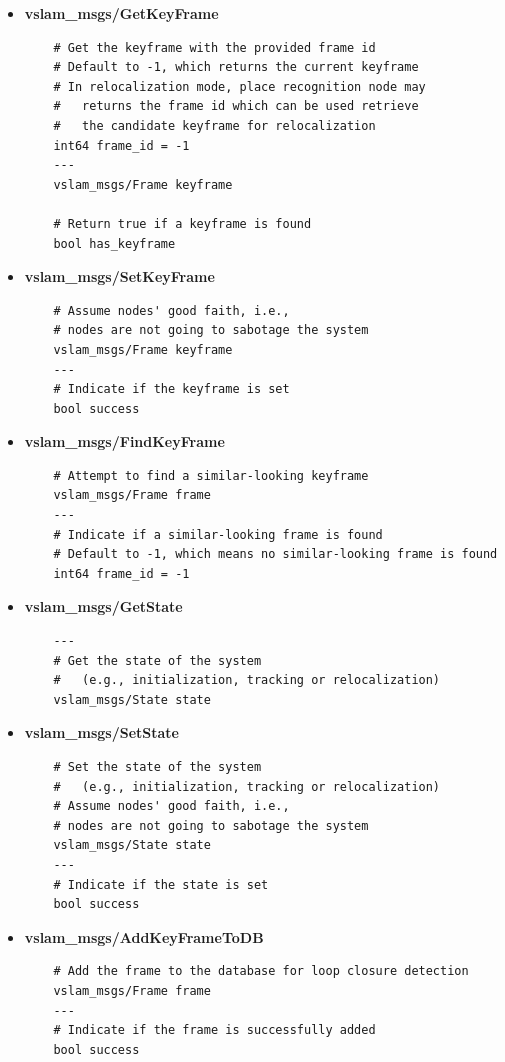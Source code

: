 \begin{itemize}
  \item \textbf{vslam\_msgs/GetKeyFrame}
  \begin{verbatim}
    # Get the keyframe with the provided frame id
    # Default to -1, which returns the current keyframe
    # In relocalization mode, place recognition node may 
    #   returns the frame id which can be used retrieve 
    #   the candidate keyframe for relocalization
    int64 frame_id = -1
    ---
    vslam_msgs/Frame keyframe
    
    # Return true if a keyframe is found
    bool has_keyframe
  \end{verbatim}

  \item \textbf{vslam\_msgs/SetKeyFrame}
  \begin{verbatim}
    # Assume nodes' good faith, i.e.,
    # nodes are not going to sabotage the system
    vslam_msgs/Frame keyframe
    ---
    # Indicate if the keyframe is set
    bool success
  \end{verbatim}

  \item \textbf{vslam\_msgs/FindKeyFrame}
  \begin{verbatim}
    # Attempt to find a similar-looking keyframe
    vslam_msgs/Frame frame
    ---
    # Indicate if a similar-looking frame is found
    # Default to -1, which means no similar-looking frame is found
    int64 frame_id = -1
  \end{verbatim}

  \item \textbf{vslam\_msgs/GetState}
  \begin{verbatim}
    ---
    # Get the state of the system 
    #   (e.g., initialization, tracking or relocalization)
    vslam_msgs/State state
  \end{verbatim}

  \item \textbf{vslam\_msgs/SetState}
  \begin{verbatim}
    # Set the state of the system 
    #   (e.g., initialization, tracking or relocalization)
    # Assume nodes' good faith, i.e.,
    # nodes are not going to sabotage the system
    vslam_msgs/State state
    ---
    # Indicate if the state is set
    bool success
  \end{verbatim}

  \item \textbf{vslam\_msgs/AddKeyFrameToDB}
  \begin{verbatim}
    # Add the frame to the database for loop closure detection
    vslam_msgs/Frame frame
    ---
    # Indicate if the frame is successfully added
    bool success
  \end{verbatim}
\end{itemize}

